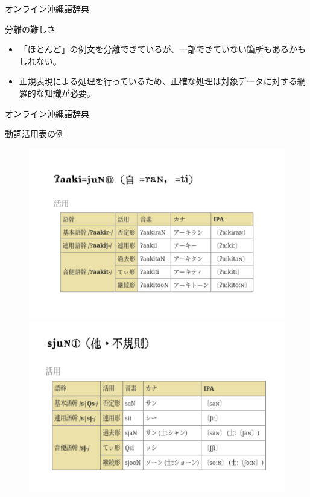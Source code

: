 \documentclass[14pt]{beamer}
\begin{document}
\begin{frame}{オンライン沖縄語辞典}
  \begin{block}{分離の難しさ}
    \begin{itemize}
    \item 「ほとんど」の例文を分離できているが、一部できていない箇所もあるかもしれない。
    \item 正規表現による処理を行っているため、正確な処理は対象データに対する網羅的な知識が必要。
    \end{itemize}
  \end{block}
\end{frame}

\begin{frame}{オンライン沖縄語辞典}
  \begin{block}{動詞活用表の例}
    \begin{figure}[ht]
      \centering
      \begin{minipage}{0.4\paperwidth}
        \includegraphics[height=0.36\paperheight]{verb-conugation-comparison.png}
      \end{minipage}%
      \begin{minipage}{0.4\textwidth}
        \includegraphics[height=0.34\paperheight]{verb-conjugation-comparison-2.png}
      \end{minipage}
    \end{figure}
  \end{block}
\end{frame}
\end{document}
